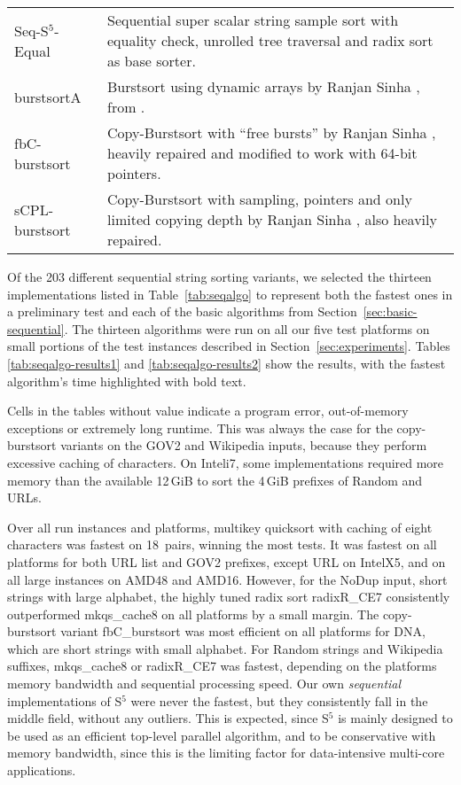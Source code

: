 \documentclass[a4paper]{myjournal}
\begin{document}
\begin{table}[tb]
\begin{tabularx}{\linewidth}{l|X}
Seq-S$^5$-Equal  & Sequential super scalar string sample sort with equality check, unrolled tree traversal and radix sort as base sorter.                                        \\
burstsortA       & Burstsort using dynamic arrays by Ranjan Sinha \cite{sinha2004cache-conscious}, from \cite{rantala2007web}.                                                   \\
fbC-burstsort    & Copy-Burstsort with ``free bursts'' by Ranjan Sinha \cite{sinha2007cache-efficient}, heavily repaired and modified to work with 64-bit pointers.              \\
sCPL-burstsort   & Copy-Burstsort with sampling, pointers and only limited copying depth by Ranjan Sinha \cite{sinha2007cache-efficient}, also heavily repaired.                 \\
\end{tabularx}
\end{table}

Of the 203 different sequential string sorting variants, we selected the
thirteen implementations listed in Table~\ref{tab:seqalgo} to represent both the
fastest ones in a preliminary test and each of the basic algorithms from
Section~\ref{sec:basic-sequential}. The thirteen algorithms were run on all our
five test platforms on small portions of the test instances described in
Section~\ref{sec:experiments}. Tables \ref{tab:seqalgo-results1} and
\ref{tab:seqalgo-results2} show the results, with the fastest algorithm's time
highlighted with bold text.

Cells in the tables without value indicate a program error, out-of-memory
exceptions or extremely long runtime. This was always the case for the
copy-burstsort variants on the GOV2 and Wikipedia inputs, because they perform
excessive caching of characters. On Inteli7, some implementations required more
memory than the available 12\,GiB to sort the 4\,GiB prefixes of Random and URLs.

Over all run instances and platforms, multikey quicksort with caching of eight
characters was fastest on 18~pairs, winning the most tests. It was fastest on
all platforms for both URL list and GOV2 prefixes, except URL on IntelX5, and on
all large instances on AMD48 and AMD16. However, for the NoDup input, short
strings with large alphabet, the highly tuned radix sort radixR\_CE7
consistently outperformed mkqs\_cache8 on all platforms by a small margin. The
copy-burstsort variant fbC\_burstsort was most efficient on all platforms for
DNA, which are short strings with small alphabet. For Random strings and
Wikipedia suffixes, mkqs\_cache8 or radixR\_CE7 was fastest, depending on the
platforms memory bandwidth and sequential processing speed.  Our own
\emph{sequential} implementations of S$^5$ were never the fastest, but they
consistently fall in the middle field, without any outliers.  This is expected,
since S$^5$ is mainly designed to be used as an efficient top-level parallel
algorithm, and to be conservative with memory bandwidth, since this is the
limiting factor for data-intensive multi-core applications.
\end{document}
